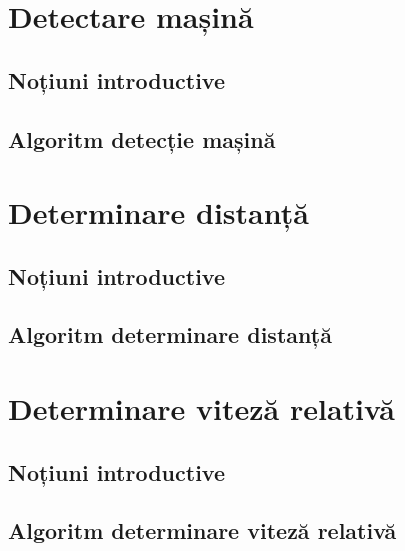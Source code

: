 \section{Detectare mașină}
\subsection{Noțiuni introductive}
\subsection{Algoritm detecție mașină}

\section{Determinare distanță}
\subsection{Noțiuni introductive}
\subsection{Algoritm determinare distanță}

\section{Determinare viteză relativă}
\subsection{Noțiuni introductive}
\subsection{Algoritm determinare viteză relativă}